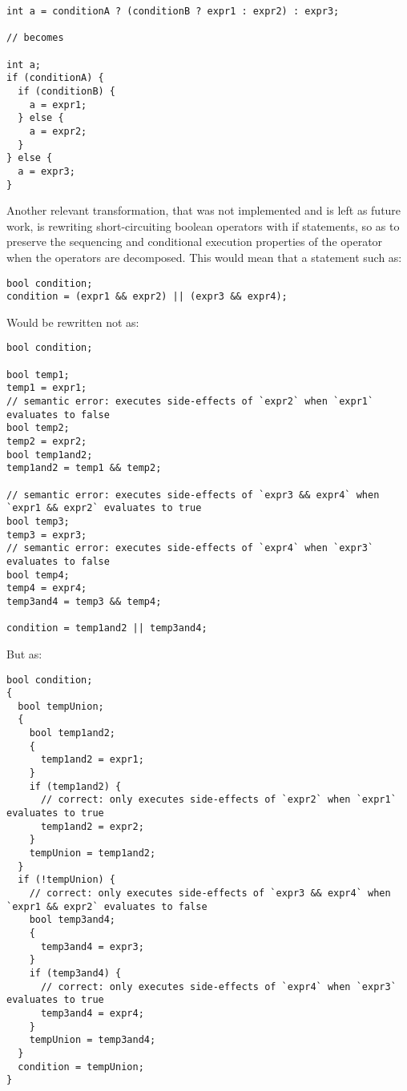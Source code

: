 \begin{lstlisting}
int a = conditionA ? (conditionB ? expr1 : expr2) : expr3;

// becomes

int a;
if (conditionA) {
  if (conditionB) {
    a = expr1;
  } else {
    a = expr2;
  }
} else {
  a = expr3;
}
\end{lstlisting}

Another relevant transformation, that was not implemented and is left as future work, is rewriting short-circuiting boolean operators with if statements, so as to preserve the sequencing and conditional execution properties of the operator when the operators are decomposed. This would mean that a statement such as:

\begin{lstlisting}
bool condition;
condition = (expr1 && expr2) || (expr3 && expr4);
\end{lstlisting}

Would be rewritten not as:

\begin{lstlisting}
bool condition;

bool temp1;
temp1 = expr1;
// semantic error: executes side-effects of `expr2` when `expr1` evaluates to false
bool temp2;
temp2 = expr2;
bool temp1and2;
temp1and2 = temp1 && temp2;

// semantic error: executes side-effects of `expr3 && expr4` when `expr1 && expr2` evaluates to true
bool temp3;
temp3 = expr3;
// semantic error: executes side-effects of `expr4` when `expr3` evaluates to false
bool temp4;
temp4 = expr4;
temp3and4 = temp3 && temp4;

condition = temp1and2 || temp3and4;
\end{lstlisting}

But as:

\begin{lstlisting}
bool condition;
{
  bool tempUnion;
  {
    bool temp1and2;
    {
      temp1and2 = expr1;
    }
    if (temp1and2) {
      // correct: only executes side-effects of `expr2` when `expr1` evaluates to true
      temp1and2 = expr2;
    }
    tempUnion = temp1and2;
  }
  if (!tempUnion) {
    // correct: only executes side-effects of `expr3 && expr4` when `expr1 && expr2` evaluates to false
    bool temp3and4;
    {
      temp3and4 = expr3;
    }
    if (temp3and4) {
      // correct: only executes side-effects of `expr4` when `expr3` evaluates to true
      temp3and4 = expr4;
    }
    tempUnion = temp3and4;
  }
  condition = tempUnion;
}
\end{lstlisting}

